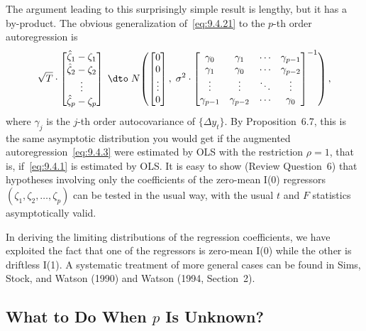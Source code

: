The argument leading to this surprisingly simple result is lengthy, but it has a
by-product. The obvious generalization of~\eqref{eq:9.4.21} to the $p$-th order autoregression is
\begin{equation}
\label{eq:9.4.27}
\sqrt{T} \cdot
\begin{bmatrix}
\hat{\zeta}_1 - \zeta_1 \\
\hat{\zeta}_2 - \zeta_2 \\
\vdots \\
\hat{\zeta}_p - \zeta_p
\end{bmatrix}
\;\dto\;
N\!\left(
\begin{bmatrix} 0 \\ 0 \\ \vdots \\ 0 \end{bmatrix},\;
\sigma^2 \cdot
\begin{bmatrix}
\gamma_0 & \gamma_1 & \cdots & \gamma_{p-1} \\
\gamma_1 & \gamma_0 & \cdots & \gamma_{p-2} \\
\vdots & \vdots & \ddots & \vdots \\
\gamma_{p-1} & \gamma_{p-2} & \cdots & \gamma_0
\end{bmatrix}^{-1}
\right),
\end{equation}
where $\gamma_j$ is the $j$-th order autocovariance of $\{\Delta y_t\}$. By Proposition~6.7, this is the
same asymptotic distribution you would get if the augmented autoregression~\eqref{eq:9.4.3}
were estimated by OLS with the restriction $\rho = 1$, that is, if~\eqref{eq:9.4.1} is estimated
by OLS. It is easy to show (Review Question~6) that hypotheses involving only
the coefficients of the zero-mean I(0) regressors $(\zeta_1, \zeta_2, \ldots, \zeta_p)$ can be tested in the
usual way, with the usual $t$ and $F$ statistics asymptotically valid.

In deriving the limiting distributions of the regression coefficients, we have
exploited the fact that one of the regressors is zero-mean I(0) while the other is
driftless I(1). A systematic treatment of more general cases can be found in Sims,
Stock, and Watson (1990) and Watson (1994, Section~2).

\subsection*{What to Do When $p$ Is Unknown?}

